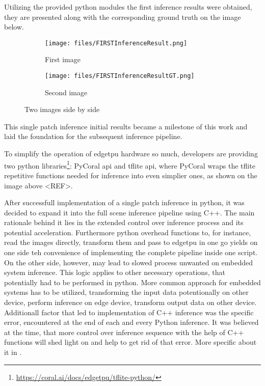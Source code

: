 {

Utilizing the provided python modules the first inference results were obtained, they are presented along with the corresponding ground truth on the image below.

\begin{figure}[htbp]
    \centering
    \begin{subfigure}{0.45\textwidth}
        \centering
        \texttt{[image: files/FIRSTInferenceResult.png]}
        \caption{First image}
    \end{subfigure}
    \hfill
    \begin{subfigure}{0.45\textwidth}
        \centering
        \texttt{[image: files/FIRSTInferenceResultGT.png]}
        \caption{Second image}
    \end{subfigure}
    \caption{Two images side by side}
    \label{fig:two-images}
\end{figure}

This single patch inference initial results became a milestone of this work and laid the foundation for the subsequent inference pipeline.

To simplify the operation of \gls{edgetpu} hardware so much, developers are providing two python libraries\footnote{\url{https://coral.ai/docs/edgetpu/tflite-python/}}:
PyCoral \gls{api} and \gls{tflite} \gls{api}, where PyCoral wraps the \gls{tflite} repetitive functions needed for inference into even simplier ones, as shown on the image above <REF>.

After successfull implementation of a single patch inference in python, it was decided to expand it into the full scene inference pipeline using C++.
The main rationale behind it lies in the extended control over inference process and its potential acceleration.
Furthermore python overhead functions to, for instance, read the  images directly,
transform them and pass to \gls{edgetpu} in one go yields on one side teh convenience of implementing the complete pipeline inside one script.
On the other side, however, may lead to slowed process unwanted on embedded system inference. This logic applies to other necessary operations,
that potentially had to be performed in python. More common approach for embedded systems has to be utilized, transforming the input data
potentionally on other device, perform inference on edge device, transform output data on other device.
Additionall factor that led to implementation of C++ inference was the specific error,
encountered at the end of each and every Python inference. It was believed at the time,
that more control over inference sequence with the help of C++ functions will shed light on and help to get rid of that error.
More specific about it in .

}
